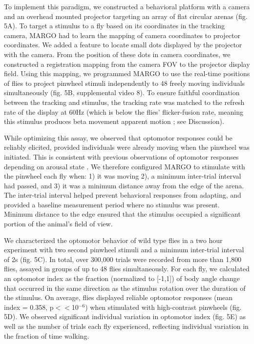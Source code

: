 \documentclass[10pt,letterpaper]{article}
\begin{document}
To implement this paradigm, we constructed a behavioral platform with a camera and an overhead mounted projector targeting an array of flat circular arenas (fig. 5A). To target a stimulus to a fly based on its coordinates in the tracking camera, MARGO had to learn the mapping of camera coordinates to projector coordinates. We added a feature to locate small dots displayed by the projector with the camera. From the position of these dots in camera coordinates, we constructed a registration mapping from the camera FOV to the projector display field. Using this mapping, we programmed MARGO to use the real-time positions of flies to project pinwheel stimuli independently to 48 freely moving individuals simultaneously (fig. 5B, supplemental video 8). To ensure faithful coordination between the tracking and stimulus, the tracking rate was matched to the refresh rate of the display at 60Hz (which is below the flies' flicker-fusion rate, meaning this stimulus produces beta movement apparent motion \cite{haag_arenz_serbe_gabbiani_borst_2016}; see Discussion). 

While optimizing this assay, we observed that optomotor responses could be reliably elicited, provided individuals were already moving when the pinwheel was initiated. This is consistent with previous observations of optomotor responses depending on arousal state \cite{Zhu_Peripheral_2009,Kim_Fly_2016}. We therefore configured MARGO to stimulate with the pinwheel each fly when: 1) it was moving 2), a minimum inter-trial interval had passed, and 3) it was a minimum distance away from the edge of the arena. The inter-trial interval helped prevent behavioral responses from adapting, and provided a baseline measurement period where no stimulus was present. Minimum distance to the edge ensured that the stimulus occupied a significant portion of the animal's field of view. 

We characterized the optomotor behavior of wild type flies in a two hour experiment with two second pinwheel stimuli and a minimum inter-trial interval of 2s (fig. 5C). In total, over 300,000 trials were recorded from more than 1,800 flies, assayed in groups of up to 48 flies simultaneously. For each fly, we calculated an optomotor index \cite{Seelig_Two_2010} as the fraction (normalized to [-1,1]) of body angle change that occurred in the same direction as the stimulus rotation over the duration of the stimulus. On average, flies displayed reliable optomotor responses (mean index = 0.358, p$<<$10$^{-6}$) when stimulated with high-contrast pinwheels (fig. 5D). We observed significant individual variation in optomotor index (fig. 5E) as well as the number of trials each fly experienced, reflecting individual variation in the fraction of time walking. 
\end{document}
